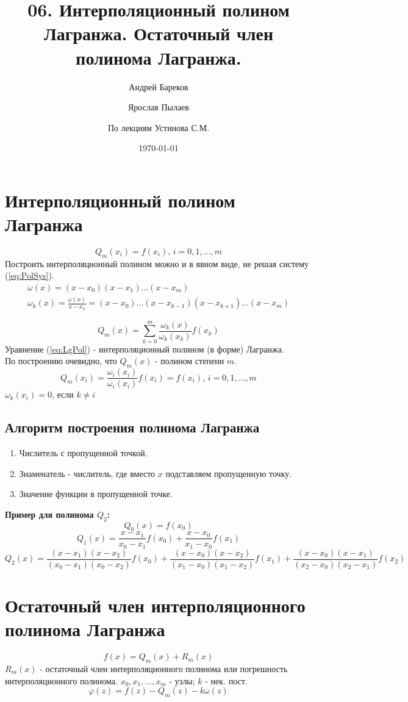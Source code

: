 \documentclass[a4paper,11pt]{article}
\title{06. Интерполяционный полином Лагранжа. Остаточный член полинома Лагранжа.}
\author{Андрей Бареков \and Ярослав Пылаев \and По лекциям Устинова С.М.}
\date{\today}
\begin{document}
\maketitle
\newpage

\section{Интерполяционный полином Лагранжа}
\begin{equation}
  Q_m(x_i) = f(x_i), \, i = 0, 1, \dots, m
  \label{eq:PolSys}
\end{equation}
Построить интерполяционный полином можно и в явном виде, не решая систему (\ref{eq:PolSys}).
\begin{gather*}
  \omega(x) = (x - x_0)(x - x_1)\dots(x - x_m) \\
  \omega_k(x) = \frac{\omega(x)}{x - x_k} = (x - x_0)\dots(x - x_{k-1})(x - x_{k+1})\dots(x - x_m)
\end{gather*}

\begin{equation}
  Q_m(x) = \sum_{k=0}^{m} \frac{\omega_k(x)}{\omega_k(x_k)} f(x_k)
  \label{eq:LgPol}
\end{equation}
Уравнение (\ref{eq:LgPol}) - интерполяционный полином (в форме) Лагранжа. \\
По построению очевидно, что $Q_m(x)$ - полином степени $m$.
\[Q_m(x_i) = \frac{\omega_i(x_i)}{\omega_i(x_i)} f(x_i) = f(x_i), \, i=0,1,\dots,m\]
\(\omega_k(x_i) = 0\), если \(k \ne i\)

  \subsection{Алгоритм построения полинома Лагранжа}
  \begin{enumerate}
    \item Числитель с пропущенной точкой.
    \item Знаменатель - числитель, где вместо $x$ подставляем пропущенную точку.
    \item Значение функции в пропущенной точке.
  \end{enumerate}
  \textbf{Пример для полинома $Q_2$:}
  \[Q_0(x) = f(x_0)\]
  \[Q_1(x) = \frac{x-x_1}{x_0-x_1}f(x_0) + \frac{x-x_0}{x_1-x_0}f(x_1)\]
  \[Q_2(x) = \frac{(x-x_1)(x-x_2)}{(x_0-x_1)(x_0-x_2)}f(x_0) + \frac{(x-x_0)(x-x_2)}{(x_1-x_0)(x_1-x_2)}f(x_1) + \frac{(x-x_0)(x-x_1)}{(x_2-x_0)(x_2-x_1)}f(x_2)\]

\section{Остаточный член интерполяционного полинома Лагранжа}
\begin{equation}
  f(x) = Q_m(x) + R_m(x)
\end{equation}
\(R_m(x)\) - остаточный член интерполяционного полинома или погрешность интерполяционного полинома.
\vspace{5mm}
\marginpar
{
  \footnotesize \(x_0, x_1, \dots, x_m\) - узлы; $k$ - нек. пост.
}
\begin{equation}
  \varphi(z) = f(z) - Q_m(z) - k\omega(z)
\end{equation}
\end{document}
